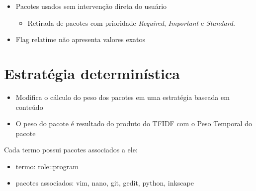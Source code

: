 \begin{frame}

    \begin{itemize}
        \item Pacotes usados sem intervenção direta do usuário
            \begin{itemize}
                \item Retirada de pacotes com prioridade \textit{Required},
                      \textit{Important} e \textit{Standard}.
            \end{itemize}
        \item Flag relatime não apresenta valores exatos
    \end{itemize}

\end{frame}

\section{Estratégia determinística} %
\label{sec:estrategia_deterministica}

\begin{frame}
\begin{itemize}
    \item Modifica o cálculo do peso dos pacotes em uma estratégia
    baseada em conteúdo
    \item O peso do pacote é resultado do produto do TFIDF com o
    Peso Temporal do pacote
\end{itemize}
\end{frame}

\begin{frame}
    Cada termo possui pacotes associados a ele:
    \begin{itemize}
        \item termo: role::program
        \item pacotes associados: vim, nano, git, gedit, python, inkscape
    \end{itemize}
\end{frame}

